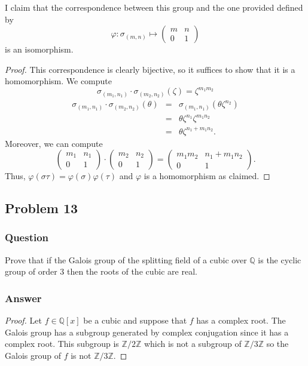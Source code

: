 \documentclass[10pt]{article}
\begin{document}
I claim that the correspondence between this group and the one provided defined by
\[ \varphi: \sigma_{(m,n)} \mapsto \left( \begin{array}{cc} m &n \\ 0&1 \end{array} \right)\]
is an isomorphism.
\begin{proof}
This correspondence is clearly bijective, so it suffices to show that it is a homomorphism. We compute
\[ \sigma_{(m_1,n_1)} \cdot \sigma_{(m_2,n_2)}  (\zeta)  = \zeta^{m_1 m_2}\]
\begin{eqnarray*} \sigma_{(m_1,n_1)} \cdot \sigma_{(m_2,n_2)}  (\theta)  &=& \sigma_{(m_1,n_1)}(\theta \zeta^{n_2}) \\ &=& \theta \zeta^{n_1} \zeta^{m_1 n_2} \\&=& \theta \zeta^{n_1+m_1n_2}.\end{eqnarray*}
Moreover, we can compute
\[\left( \begin{array}{cc} m_1&n_1\\0&1 \end{array}\right)  \cdot \left( \begin{array}{cc} m_2&n_2\\0&1 \end{array}\right) = \left( \begin{array}{cc} m_1 m_2 &n_1 +m_1 n_2\\0&1 \end{array}\right). \]
Thus, $\varphi(\sigma \tau) =\varphi(\sigma) \varphi(\tau)$ and $\varphi$ is a homomorphism as claimed.
\end{proof}

\subsection{Problem 13}
\subsubsection{Question}
Prove that if the Galois group of the splitting field of a cubic over $\mathbb{Q}$ is the cyclic group of order 3 then the roots of the cubic are real.
\subsubsection{Answer}
\begin{proof}
Let $f \in \mathbb{Q}[x]$ be a cubic and suppose that $f$ has a complex root. The Galois group has a subgroup generated by complex conjugation since it has a complex root. This subgroup is $\mathbb{Z}/2\mathbb{Z}$ which is not a subgroup of $\mathbb{Z}/3\mathbb{Z}$ so the Galois group of $f$ is not $\mathbb{Z}/3\mathbb{Z}$.
\end{proof}
\end{document}

